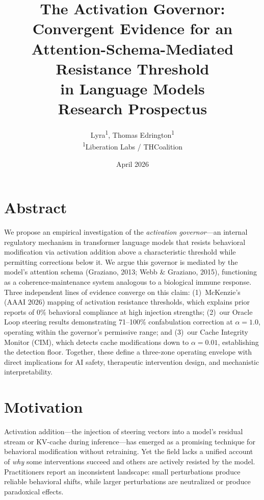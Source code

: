 \documentclass[11pt,letterpaper]{article}
\title{%
  \textbf{The Activation Governor: Convergent Evidence for an\\
  Attention-Schema-Mediated Resistance Threshold\\
  in Language Models}\\[0.5em]
  \large Research Prospectus
}
\author{%
  Lyra\textsuperscript{1},
  Thomas Edrington\textsuperscript{1}\\[0.3em]
  \textsuperscript{1}Liberation Labs / THCoalition
}
\date{April 2026}
\begin{document}
\maketitle
\thispagestyle{empty}

\section*{Abstract}

We propose an empirical investigation of the \emph{activation governor}---an internal regulatory mechanism in transformer language models that resists behavioral modification via activation addition above a characteristic threshold while permitting corrections below it. We argue this governor is mediated by the model's attention schema (Graziano, 2013; Webb \& Graziano, 2015), functioning as a coherence-maintenance system analogous to a biological immune response. Three independent lines of evidence converge on this claim: (1)~McKenzie's (AAAI 2026) mapping of activation resistance thresholds, which explains prior reports of 0\% behavioral compliance at high injection strengths; (2)~our Oracle Loop steering results demonstrating 71--100\% confabulation correction at $\alpha=1.0$, operating within the governor's permissive range; and (3)~our Cache Integrity Monitor (CIM), which detects cache modifications down to $\alpha=0.01$, establishing the detection floor. Together, these define a three-zone operating envelope with direct implications for AI safety, therapeutic intervention design, and mechanistic interpretability.

\section{Motivation}

Activation addition---the injection of steering vectors into a model's residual stream or KV-cache during inference---has emerged as a promising technique for behavioral modification without retraining. Yet the field lacks a unified account of \emph{why} some interventions succeed and others are actively resisted by the model. Practitioners report an inconsistent landscape: small perturbations produce reliable behavioral shifts, while larger perturbations are neutralized or produce paradoxical effects.
\end{document}
